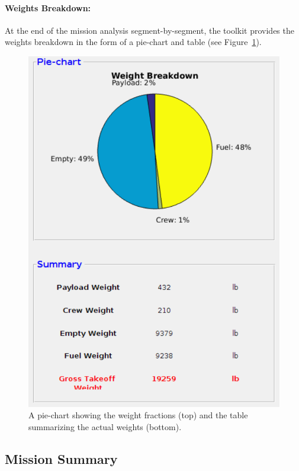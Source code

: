 \documentclass[pdftex,11pt,letter]{article}
\begin{document}
\paragraph{Weights Breakdown:}
At the end of the mission analysis segment-by-segment, the toolkit provides the weights breakdown in the form of a pie-chart and table (see Figure~\ref{weight_result}).
\begin{figure}[H]
\centering
	\includegraphics[scale=0.5]{figures/weight_result.pdf}
        \caption{A pie-chart showing the weight fractions (top) and the table summarizing the actual weights (bottom).}
\label{weight_result}
\end{figure}

\subsection{Mission Summary}
\end{document}
